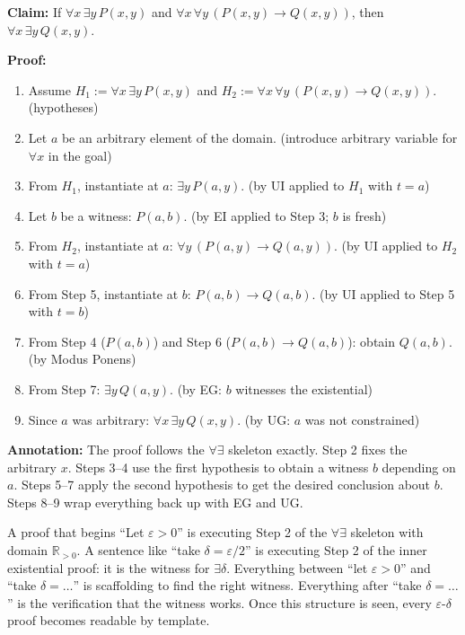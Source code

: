 \begin{example*}
\textbf{Claim:} If $\forall x\,\exists y\,P(x,y)$ and $\forall x\,\forall y\,
(P(x,y) \to Q(x,y))$, then $\forall x\,\exists y\,Q(x,y)$.

\medskip
\textbf{Proof:}

\begin{enumerate}
\item Assume $H_1 := \forall x\,\exists y\,P(x,y)$ and
  $H_2 := \forall x\,\forall y\,(P(x,y) \to Q(x,y))$.
  \quad (hypotheses)

\item Let $a$ be an arbitrary element of the domain.
  \quad (introduce arbitrary variable for $\forall x$ in the goal)

\item From $H_1$, instantiate at $a$: $\exists y\,P(a,y)$.
  \quad (by UI applied to $H_1$ with $t = a$)

\item Let $b$ be a witness: $P(a,b)$.
  \quad (by EI applied to Step 3; $b$ is fresh)

\item From $H_2$, instantiate at $a$: $\forall y\,(P(a,y) \to Q(a,y))$.
  \quad (by UI applied to $H_2$ with $t = a$)

\item From Step 5, instantiate at $b$: $P(a,b) \to Q(a,b)$.
  \quad (by UI applied to Step 5 with $t = b$)

\item From Step 4 ($P(a,b)$) and Step 6 ($P(a,b) \to Q(a,b)$): obtain $Q(a,b)$.
  \quad (by Modus Ponens)

\item From Step 7: $\exists y\,Q(a,y)$.
  \quad (by EG: $b$ witnesses the existential)

\item Since $a$ was arbitrary: $\forall x\,\exists y\,Q(x,y)$.
  \quad (by UG: $a$ was not constrained)
\end{enumerate}

\textbf{Annotation:} The proof follows the $\forall\exists$ skeleton exactly.
Step 2 fixes the arbitrary $x$. Steps 3--4 use the first hypothesis to obtain
a witness $b$ depending on $a$. Steps 5--7 apply the second hypothesis to get
the desired conclusion about $b$. Steps 8--9 wrap everything back up with
EG and UG.
\end{example*}

\begin{remark*}
A proof that begins ``Let $\varepsilon > 0$'' is executing Step 2 of the
$\forall\exists$ skeleton with domain $\mathbb{R}_{>0}$. A sentence like
``take $\delta = \varepsilon/2$'' is executing Step 2 of the inner existential
proof: it is the witness for $\exists\delta$. Everything between ``let
$\varepsilon > 0$'' and ``take $\delta = \ldots$'' is scaffolding to find the
right witness. Everything after ``take $\delta = \ldots$'' is the verification
that the witness works. Once this structure is seen, every $\varepsilon$-$\delta$
proof becomes readable by template.
\end{remark*}
